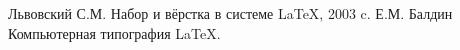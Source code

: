 \documentclass[12pt]{article}
\begin{document}
 

%
\newpage
{}
\begin{thebibliography}{99}
 Львовский С.М. Набор и вёрстка в системе \LaTeX, 2003 c.
 Е.М. Балдин Компьютерная типография \LaTeX.
\end{thebibliography}
\end{document}

